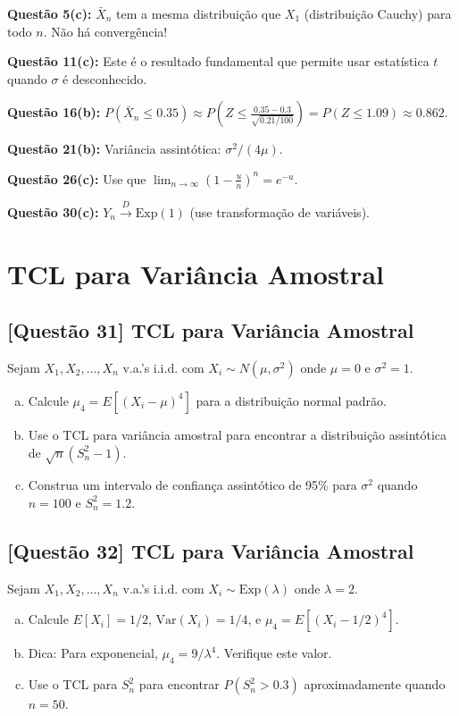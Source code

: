 \documentclass[12pt,a4paper]{article}
\begin{document}
\textbf{Questão 5(c):} $\bar{X}_n$ tem a mesma distribuição que $X_1$ (distribuição Cauchy) para todo $n$. Não há convergência!

\textbf{Questão 11(c):} Este é o resultado fundamental que permite usar estatística $t$ quando $\sigma$ é desconhecido.

\textbf{Questão 16(b):} $P(\bar{X}_n \leq 0.35) \approx P\left(Z \leq \frac{0.35 - 0.3}{\sqrt{0.21/100}}\right) = P(Z \leq 1.09) \approx 0.862$.

\textbf{Questão 21(b):} Variância assintótica: $\sigma^2/(4\mu)$.

\textbf{Questão 26(c):} Use que $\lim_{n \to \infty} \left(1 - \frac{u}{n}\right)^n = e^{-u}$.

\textbf{Questão 30(c):} $Y_n \xrightarrow{D} \text{Exp}(1)$ (use transformação de variáveis).

\section{TCL para Variância Amostral}

\subsection*{[Questão 31] TCL para Variância Amostral}

Sejam $X_1, X_2, \ldots, X_n$ v.a.'s i.i.d. com $X_i \sim N(\mu, \sigma^2)$ onde $\mu = 0$ e $\sigma^2 = 1$.

\begin{enumerate}[(a)]
    \item Calcule $\mu_4 = E[(X_i - \mu)^4]$ para a distribuição normal padrão.
    \item Use o TCL para variância amostral para encontrar a distribuição assintótica de $\sqrt{n}(S_n^2 - 1)$.
    \item Construa um intervalo de confiança assintótico de 95\% para $\sigma^2$ quando $n = 100$ e $S_n^2 = 1.2$.
\end{enumerate}

\subsection*{[Questão 32] TCL para Variância Amostral}

Sejam $X_1, X_2, \ldots, X_n$ v.a.'s i.i.d. com $X_i \sim \text{Exp}(\lambda)$ onde $\lambda = 2$.

\begin{enumerate}[(a)]
    \item Calcule $E[X_i] = 1/2$, $\text{Var}(X_i) = 1/4$, e $\mu_4 = E[(X_i - 1/2)^4]$.
    \item Dica: Para exponencial, $\mu_4 = 9/\lambda^4$. Verifique este valor.
    \item Use o TCL para $S_n^2$ para encontrar $P(S_n^2 > 0.3)$ aproximadamente quando $n = 50$.
\end{enumerate}
\end{document}
